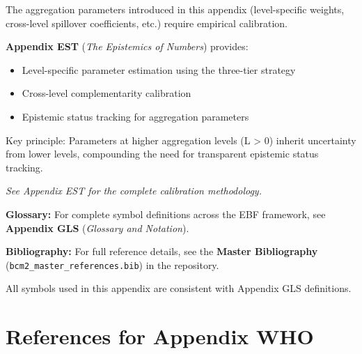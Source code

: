 The aggregation parameters introduced in this appendix (level-specific weights, 
cross-level spillover coefficients, etc.) require empirical calibration.

\textbf{Appendix EST} (\textit{The Epistemics of Numbers}) provides:
\begin{itemize}[nosep]
    \item Level-specific parameter estimation using the three-tier strategy
    \item Cross-level complementarity calibration
    \item Epistemic status tracking for aggregation parameters
\end{itemize}

Key principle: Parameters at higher aggregation levels (L > 0) inherit 
uncertainty from lower levels, compounding the need for transparent 
epistemic status tracking.

\noindent\textit{See Appendix EST for the complete calibration methodology.}




\begin{tcolorbox}[colback=blue!5!white, colframe=blue!75!black, 
    title=\textbf{Central References}]

\textbf{Glossary:} For complete symbol definitions across the EBF framework, 
see \textbf{Appendix GLS} (\textit{Glossary and Notation}).

\textbf{Bibliography:} For full reference details, see the 
\textbf{Master Bibliography} (\texttt{bcm2\_master\_references.bib}) 
in the repository.

All symbols used in this appendix are consistent with Appendix GLS definitions.

\end{tcolorbox}

\section{References for Appendix WHO}
\label{sec:aaa-references}

%
%

